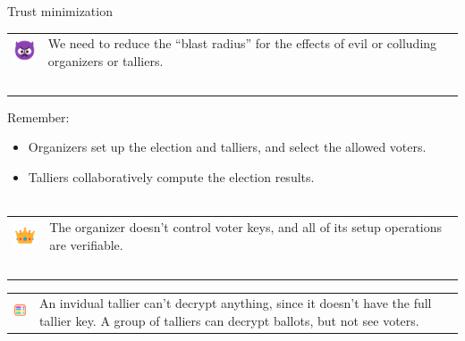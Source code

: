\documentclass[aspectratio=169]{beamer}
\begin{document}
\begin{frame}{Trust minimization}
    \begin{tabular}{>{\arraybackslash}m{40px} >{\arraybackslash}m{320px}}
        \includegraphics[width=30px]{images/evil.png} & We need to reduce the ``blast radius'' for the effects of evil or colluding organizers or talliers. \\~\\
    \end{tabular}

    Remember:
    \begin{itemize}
        \item Organizers set up the election and talliers, and select the allowed voters.
        \item Talliers collaboratively compute the election results. \\~\\
    \end{itemize}

    \begin{tabular}{>{\arraybackslash}m{40px} >{\arraybackslash}m{320px}}
        \includegraphics[width=30px]{images/crown.png} & The organizer doesn't control voter keys, and all of its setup operations are verifiable. \\~\\
    \end{tabular}

    \begin{tabular}{>{\arraybackslash}m{40px} >{\arraybackslash}m{320px}}
        \includegraphics[width=30px]{images/abacus.png} & An invidual tallier can't decrypt anything, since it doesn't have the full tallier key.
        A group of talliers can decrypt ballots, but not see voters.
    \end{tabular}
\end{frame}
\end{document}
